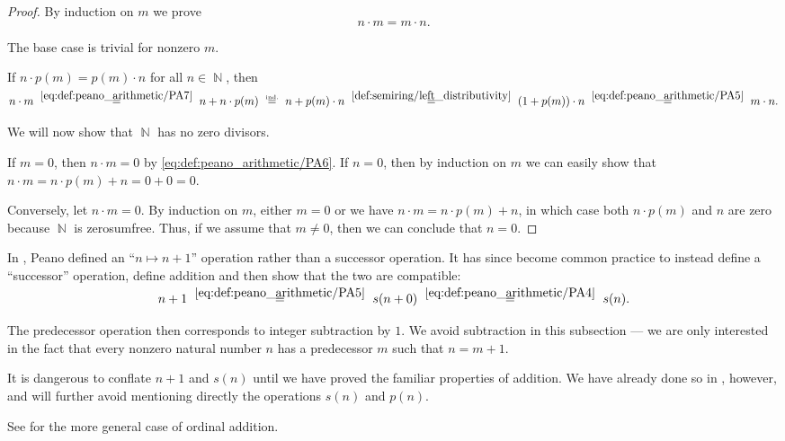 \begin{proof}
   By induction on \( m \) we prove
  \begin{equation*}
    n \cdot m = m \cdot n.
  \end{equation*}

  The base case is trivial for nonzero \( m \).

  If \( n \cdot p(m) = p(m) \cdot n \) for all \( n \in \BbbN \), then
  \begin{equation*}
    n \cdot m
    \reloset{\eqref{eq:def:peano_arithmetic/PA7}} =
    n + n \cdot p(m)
    \reloset {\T{ind.}} =
    n + p(m) \cdot n
    \reloset{\eqref{def:semiring/left_distributivity}} =
    (1 + p(m)) \cdot n
    \reloset{\eqref{eq:def:peano_arithmetic/PA5}} =
    m \cdot n.
  \end{equation*}

   We will now show that \( \BbbN \) has no zero divisors.

  If \( m = 0 \), then \( n \cdot m = 0 \) by \eqref{eq:def:peano_arithmetic/PA6}. If \( n = 0 \), then by induction on \( m \) we can easily show that \( n \cdot m = n \cdot p(m) + n = 0 + 0 = 0 \).

  Conversely, let \( n \cdot m = 0 \). By induction on \( m \), either \( m = 0 \) or we have \( n \cdot m = n \cdot p(m) + n \), in which case both \( n \cdot p(m) \) and \( n \) are zero because \( \BbbN \) is zerosumfree. Thus, if we assume that \( m \neq 0 \), then we can conclude that \( n = 0 \).
\end{proof}

\begin{remark}\label{rem:natural_number_successor_via_addition}
  In \cite[1]{Peano1889PA}, Peano defined an \enquote{\( n \mapsto n + 1 \)} operation rather than a successor operation. It has since become common practice to instead define a \enquote{successor} operation, define addition and then show that the two are compatible:
  \begin{equation*}
    n + 1
    \reloset {\eqref{eq:def:peano_arithmetic/PA5}} =
    s(n + 0)
    \reloset {\eqref{eq:def:peano_arithmetic/PA4}} =
    s(n).
  \end{equation*}

  The predecessor operation then corresponds to integer subtraction by \( 1 \). We avoid subtraction in this subsection --- we are only interested in the fact that every nonzero natural number \( n \) has a predecessor \( m \) such that \( n = m + 1 \).

  It is dangerous to conflate \( n + 1 \) and \( s(n) \) until we have proved the familiar properties of addition. We have already done so in , however, and will further avoid mentioning directly the operations \( s(n) \) and \( p(n) \).

  See  for the more general case of ordinal addition.
\end{remark}

